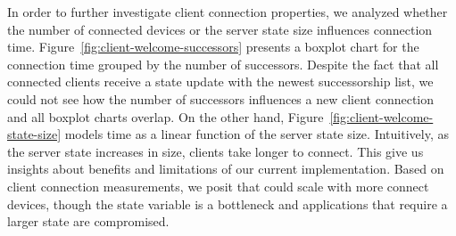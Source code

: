 In order to further investigate client connection properties, we analyzed whether the number of connected devices or the server state size influences connection time.
Figure~\ref{fig:client-welcome-successors} presents a boxplot chart for the connection time grouped by the number of successors.
Despite the fact that all connected clients receive a state update with the newest successorship list, 
we could not see how the number of successors influences a new client connection and all boxplot charts overlap.
On the other hand, Figure~\ref{fig:client-welcome-state-size} models time as a linear function of the server state size.
Intuitively, as the server state increases in size, clients take longer to connect. 
This give us insights about benefits and limitations of our current implementation.
Based on client connection measurements, we posit that \APIshort could scale with more connect devices, though the state variable is a bottleneck and applications that require a larger state are compromised.



    

